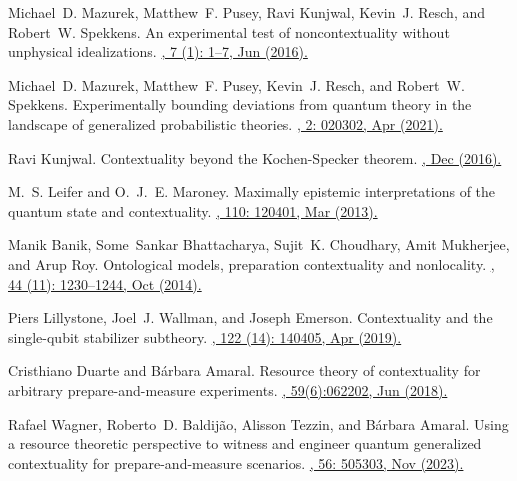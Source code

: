 \documentclass[a4paper,twocolumn,11pt,accepted=2024-01-17]{quantumarticle}
\begin{document}
\begin{thebibliography}{100}
Michael~D. Mazurek, Matthew~F. Pusey, Ravi Kunjwal, Kevin~J. Resch, and
  Robert~W. Spekkens.
\newblock An experimental test of noncontextuality without unphysical  idealizations.
\href{https://doi.org/10.1038/ncomms11780}{, 7 (1): 1--7, Jun (2016).}

Michael~D. Mazurek, Matthew~F. Pusey, Kevin~J. Resch, and Robert~W. Spekkens.
\newblock Experimentally bounding deviations from quantum theory in the landscape of generalized probabilistic theories.
\href{https://doi.org/10.1103/PRXQuantum.2.020302}{, 2: 020302, Apr (2021).}

Ravi Kunjwal.
\newblock Contextuality beyond the {K}ochen-{S}pecker theorem.
\href{https://doi.org/10.48550/arXiv.1612.07250}{, Dec (2016).}

M.~S. Leifer and O.~J.~E. Maroney.
\newblock Maximally epistemic interpretations of the quantum state and contextuality.
\href{https://doi.org/10.1103/PhysRevLett.110.120401}{, 110: 120401, Mar (2013).}

Manik Banik, Some~Sankar Bhattacharya, Sujit~K. Choudhary, Amit Mukherjee, and
  Arup Roy.
\newblock Ontological models, preparation contextuality and nonlocality.
\href{https://doi.org/10.1007/s10701-014-9839-4}{, 44 (11): 1230--1244, Oct (2014).}

Piers Lillystone, Joel~J. Wallman, and Joseph Emerson.
\newblock Contextuality and the single-qubit stabilizer subtheory.
\href{https://doi.org/10.1103/PhysRevLett.122.140405}{, 122 (14): 140405, Apr (2019).}

Cristhiano Duarte and B\'{a}rbara Amaral.
\newblock Resource theory of contextuality for arbitrary prepare-and-measure experiments.
\href{https://doi.org/10.1063/1.5018582}{, 59(6):062202, Jun (2018).}

Rafael Wagner, Roberto~D. Baldij{\~a}o, Alisson Tezzin, and B{\'a}rbara Amaral.
\newblock Using a resource theoretic perspective to witness and engineer
  quantum generalized contextuality for prepare-and-measure scenarios.
\href{http://dx.doi.org/10.1088/1751-8121/ad0bcc}{, 56: 505303, Nov (2023).}


\end{thebibliography}
\end{document}
